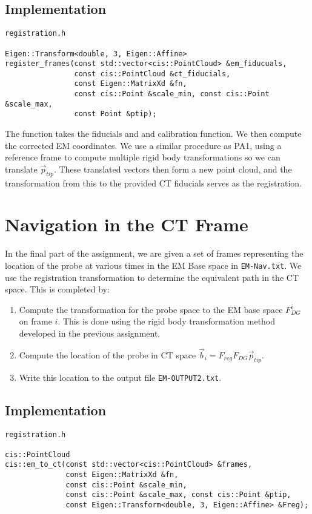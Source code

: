 \documentclass[letterpaper, 11pt]{report}
\begin{document}
\subsection*{Implementation}
\begin{verbatim}
registration.h

Eigen::Transform<double, 3, Eigen::Affine>
register_frames(const std::vector<cis::PointCloud> &em_fiducuals,
                const cis::PointCloud &ct_fiducials,
                const Eigen::MatrixXd &fn,
                const cis::Point &scale_min, const cis::Point &scale_max,
                const Point &ptip);
\end{verbatim}

The function takes the fiducials and and calibration function. We then compute the corrected EM coordinates. We use a similar procedure as PA1, using a reference frame to compute multiple rigid body transformations so we can translate $\vec p_{tip}$. These translated vectors then form a new point cloud, and the transformation from this to the provided CT fiducials serves as the registration.

\section{Navigation in the CT Frame}
In the final part of the assignment, we are given a set of frames representing the location of the probe at various times in the EM Base space in \texttt{EM-Nav.txt}. We use the registration transformation to determine the equivalent path in the CT space. This is completed by:
\begin{enumerate}
\item Compute the transformation for the probe space to the EM base space $F_{DG}^{i}$ on frame $i$. This is done using the rigid body transformation method developed in the previous assignment.
\item Compute the location of the probe in CT space $\vec b_i = F_{reg}F_{DG}\vec p_{tip}$.
\item Write this location to the output file \texttt{EM-OUTPUT2.txt}.
\end{enumerate}
\subsection*{Implementation}
\begin{verbatim}
registration.h

cis::PointCloud
cis::em_to_ct(const std::vector<cis::PointCloud> &frames,
              const Eigen::MatrixXd &fn,
              const cis::Point &scale_min,
              const cis::Point &scale_max, const cis::Point &ptip,
              const Eigen::Transform<double, 3, Eigen::Affine> &Freg);
\end{verbatim}
\end{document}
